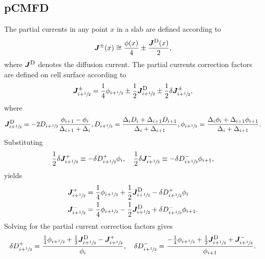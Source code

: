 \documentclass[letterpaper]{physor2020}
\newcommand{\jp}{\ensuremath{\bm{J}^+}}
\newcommand{\jm}{\ensuremath{\bm{J}^-}}
\newcommand{\jpm}{\ensuremath{\bm{J}^\pm}}
\newcommand{\jD}{\ensuremath{\bm{J}^{\textrm{\scriptsize{D}}}}}
\newcommand{\hzi}{\ensuremath{\sfrac{1}{2}}}
\begin{document}
\subsection{pCMFD}
\label{sec:RM-pCMFD}

The partial currents in any point $x$ in a slab are defined according to
\begin{equation}
\label{eq:partial-current}
\jpm(x) \cong \frac{\phi(x)}{4} \pm \frac{\jD (x)}{2},
\end{equation}
where $\jD$ denotes the diffusion current.
The partial currents correction factors are defined on cell surface according to
\begin{equation}
\label{eq:PCCF}
\jpm _{i+\hzi} = \frac{1}{4}\phi_{i+\hzi}
\pm \frac{1}{2} \jD _{i+\hzi} \pm \frac{1}{2} \delta \jpm _{i+\hzi},
\end{equation}
where
\begin{equation}
\label{eq:jdiff}
\jD _{i+\hzi} = - 2 D_{i+\hzi} \frac{\phi_{i+1} - \phi_i}{\Delta_{i+1}+\Delta_i}, %
D_{i+\hzi} = \frac{\Delta_i D_i + \Delta_{i+1} D_{i+1}}{\Delta_i + \Delta_{i+1}}, %
\phi_{i+\hzi} = \frac{\Delta_i \phi_i + \Delta_{i+1} \phi_{i+1}}{\Delta_i + \Delta_{i+1}}.
\end{equation}
Substituting~\cite{Jarrett-2016,Zhu-2016}
\begin{equation}
\label{eq:CCF-sub}
\frac{1}{2} \delta \jp _{i+\hzi} \equiv -\delta D^+ _{i+\hzi} \phi_i,
\quad
\frac{1}{2} \delta \jm _{i+\hzi} \equiv -\delta D^- _{i+\hzi} \phi_{i+1},
\end{equation}
yields
\begin{align}
\label{eq:par4}
\jp _{i+\hzi} &= \frac{1}{4}\phi_{i+\hzi}
+ \frac{1}{2}\jD _{i+\hzi} - \delta D^+ _{i+\hzi} \phi_i \\
\jm _{i+\hzi} &= \frac{1}{4}\phi_{i+\hzi}
- \frac{1}{2}\jD _{i+\hzi} + \delta D^- _{i+\hzi} \phi_{i+1}.
\end{align}
%
Solving for the partial current correction factors gives
\begin{equation}
\label{eq:ccfsss1}
\delta D^+ _{i+\hzi} = \frac{\frac{1}{4}\phi_{i+\hzi}
	+ \frac{1}{2}\jD _{i+\hzi} - \jp _{i+\hzi}}{\phi_i}, \quad
\delta D^- _{i+\hzi} = \frac{-\frac{1}{4}\phi_{i+\hzi}
	+ \frac{1}{2}\jD _{i+\hzi} + \jm _{i+\hzi}}{\phi_{i+1}}.
\end{equation}
\end{document}
